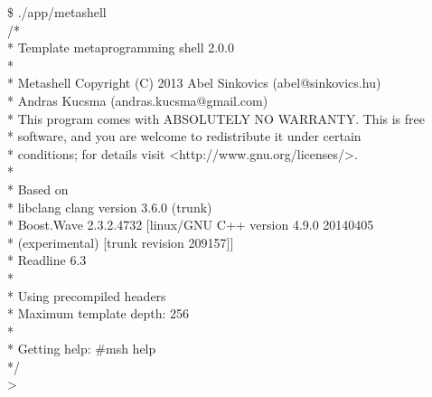 
\begin{tttenv}
\noindent
{\color{color02} \$} ./app/metashell \\
{\color{color03}/* } \\
{\color{color03} * Template metaprogramming shell 2.0.0 } \\
{\color{color03} * } \\
{\color{color03} * Metashell Copyright (C) 2013 Abel Sinkovics (abel@sinkovics.hu)} \\
{\color{color03} * \hspace{14em}                Andras Kucsma  (andras.kucsma@gmail.com)} \\
{\color{color03} * This program comes with ABSOLUTELY NO WARRANTY. This is free}  \\
{\color{color03} * software, and you are welcome to redistribute it under certain} \\
{\color{color03} * conditions; for details visit <http://www.gnu.org/licenses/>. } \\
{\color{color03} * } \\
{\color{color03} * Based on } \\
{\color{color03} * \hspace{1em} libclang   clang version 3.6.0 (trunk) } \\
{\color{color03} * \hspace{1em} Boost.Wave 2.3.2.4732 [linux/GNU C++ version 4.9.0 20140405 } \\
{\color{color03} * \hspace{12em}        (experimental) [trunk revision 209157]] } \\
{\color{color03} * \hspace{1em} Readline   6.3 } \\
{\color{color03} * } \\
{\color{color03} * Using precompiled headers } \\
{\color{color03} * Maximum template depth: 256 } \\
{\color{color03} * } \\
{\color{color03} * Getting help: \#msh help } \\
{\color{color03} */} \\
>
\end{tttenv}

